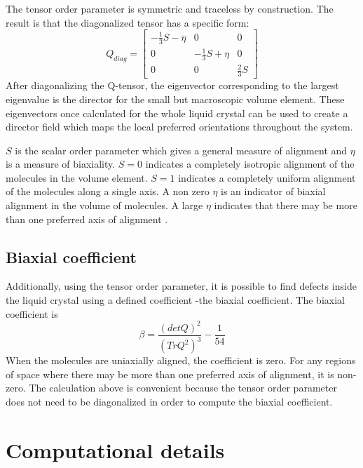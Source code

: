 \documentclass[preprint, aps]{revtex4-1}
\begin{document}
The tensor order parameter is symmetric and traceless by construction. The 
result is that the diagonalized tensor has a specific form:
	\begin{equation*} \label{diag-q-tensor}
		Q_{diag} = 
		\begin{bmatrix}
			-\frac{1}{3} S - \eta 
			& 0 
			& 0 \\
			0 
			& -\frac{1}{3} S + \eta 
			& 0 \\
			0 
			& 0 
			& \frac{2}{3} S
		\end{bmatrix}
	\end{equation*}
After diagonalizing the Q-tensor, the eigenvector corresponding to the largest
eigenvalue is the director for the small but macroscopic volume element. These
eigenvectors once calculated for the whole liquid crystal can be used to create
a director field which maps the local preferred orientations throughout the
system. 

$S$ is the scalar order parameter which gives a general measure of alignment 
and $\eta$ is a measure of biaxiality. $S=0$ indicates a completely isotropic 
alignment of the molecules in the volume element. $S=1$ indicates a completely 
uniform alignment of the molecules along a single axis. A non zero $\eta$ is an 
indicator of biaxial alignment in the volume of molecules. A large $\eta$ 
indicates that there may be more than one preferred axis of alignment
\cite{degennes95}.

\subsection*{Biaxial coefficient}
Additionally, using the tensor order parameter, it is possible to find defects 
inside the liquid crystal using a defined coefficient -the biaxial coefficient. 
The biaxial coefficient is
	\begin{equation} \label{biaxial}
		\beta = \frac{(detQ)^2}{(TrQ^2)^3} - \frac{1}{54}
	\end{equation}
When the molecules are uniaxially aligned, the coefficient is zero. For any
regions of space where there may be more than one preferred axis of alignment,
it is non-zero. The calculation above is convenient because the tensor order
parameter does not need to be diagonalized in order to compute the biaxial
coefficient.

\section*{Computational details}
\end{document}
